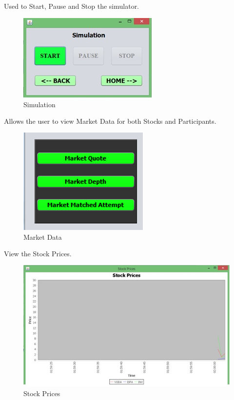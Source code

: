 \documentclass[12pt]{article}
\begin{document}
    Used to Start, Pause and Stop the simulator.

\pagebreak            
\begin{figure}[h!]
\centering
\includegraphics[scale=0.8]{simulation}
\caption{Simulation}
\label{Simulation}
\end{figure}

Allows the user to view Market Data for both Stocks and Participants.

\begin{figure}[h!]
\centering
\includegraphics[scale=0.8]{marketdata}
\caption{Market Data}
\label{Market Data}
\end{figure}
        
        View the Stock Prices.

	\begin{figure}[h!]
	\centering
	\includegraphics[scale=0.8]{stockprices}
	\caption{Stock Prices}
	\label{Stock Prices}
	\end{figure}
	
\end{document}

